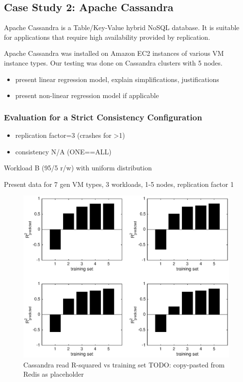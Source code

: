 \documentclass{acm_proc_article-sp}
\newcommand{\mm}[1]{{\color{red}#1}}
\begin{document}
\subsection{Case Study 2: Apache Cassandra}
\vspace{10pt}

\mm{
Apache Cassandra is a Table/Key-Value hybrid NoSQL database.  It is suitable for applications that require high availability provided by replication.

Apache Cassandra was installed on Amazon EC2 instances of various VM instance types.  Our testing was done on Cassandra clusters with 5 nodes.

\begin{itemize}
   \item present linear regression model, explain simplifications, justifications
   \item present non-linear regression model if applicable
\end{itemize}

\subsubsection{Evaluation for a Strict Consistency Configuration}

\begin{itemize}
\item replication factor=3 (crashes for >1)
\item consistency N/A (ONE==ALL)
\end{itemize}
Workload B (95/5 r/w) with uniform distribution

Present data for
7 gen VM types, 3 workloads, 1-5 nodes, replication factor 1

  \begin{figure}
    \centering
    \includegraphics[scale = 0.5]{bar_read_avg_latency.eps}
    \caption{Cassandra read R-squared vs training set TODO: copy-pasted from Redis as placeholder}
    \label{figure:redisbarread}
  \end{figure}

}
\end{document}
